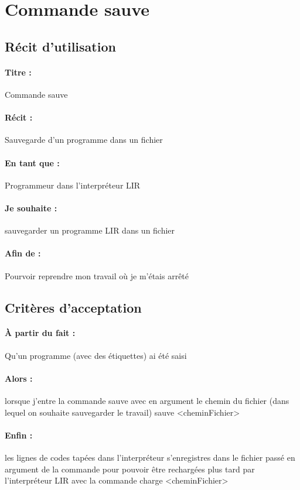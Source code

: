 \section{Commande sauve}

\subsection*{Récit d'utilisation}

\paragraph{Titre : } Commande sauve
\paragraph{Récit : } Sauvegarde d'un programme dans un fichier
\paragraph{En tant que : } Programmeur dans l'interpréteur LIR
\paragraph{Je souhaite : } sauvegarder un programme LIR dans un fichier
\paragraph{Afin de : } Pourvoir reprendre mon travail où je m'étais arrêté

\subsection*{Critères d'acceptation}

\paragraph{À partir du fait : } Qu'un programme (avec des étiquettes) ai été saisi
\paragraph{Alors : } lorsque j'entre la commande sauve avec en argument le chemin du fichier (dans lequel on souhaite sauvegarder le travail)
                     sauve <cheminFichier>
\paragraph{Enfin : } les lignes de codes tapées dans l'interpréteur s'enregistres dans le fichier passé en argument de la commande
                     pour pouvoir être rechargées plus tard par l'interpréteur LIR avec la commande charge <cheminFichier>
